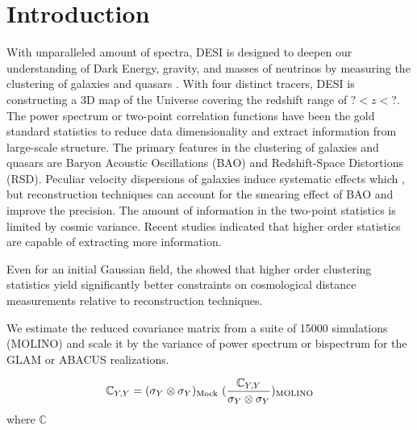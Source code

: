 \section{Introduction}
\label{sec:introduction}
With unparalleled amount of spectra, DESI is designed to deepen our understanding of Dark Energy, gravity, and masses of neutrinos by measuring the clustering of galaxies and quasars . With four distinct tracers, DESI is constructing a 3D map of the Universe covering the redshift range of $? < z < ?$. The power spectrum or two-point correlation functions have been the gold standard statistics to reduce data dimensionality and extract information from large-scale structure. The primary features in the clustering of galaxies and quasars are Baryon Acoustic Oscillations (BAO) and Redshift-Space Distortions (RSD). Peculiar velocity dispersions of galaxies induce systematic effects which , but reconstruction techniques can account for the smearing effect of BAO and improve the precision. The amount of information in the two-point statistics is limited by cosmic variance. Recent studies indicated that higher order statistics are capable of extracting more information.

Even for an initial Gaussian field, the \cite{samushia2021information} showed that higher order clustering statistics yield significantly better constraints on cosmological distance measurements relative to reconstruction techniques. 

We estimate the reduced covariance matrix from a suite of 15000 simulations (MOLINO) and scale it by the variance of power spectrum or bispectrum for the GLAM or ABACUS realizations.

\begin{equation}
	\mathbb{C}_{Y,Y} = (\sigma_{Y} \otimes \sigma_{Y})_{\rm Mock} ~ (\frac{\mathbb{C}_{Y,Y}}{\sigma_{Y} \otimes \sigma_{Y}})_{\rm MOLINO}
\end{equation}
where $\mathbb{C}$

